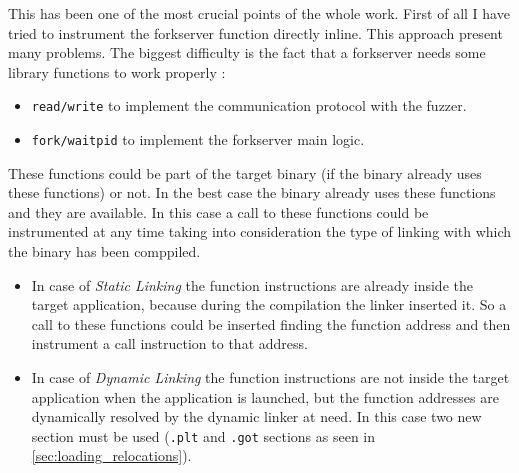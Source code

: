 This has been one of the most crucial points of the whole work.
First of all I have tried to instrument the forkserver function directly inline.
This approach present many problems. The biggest difficulty is the fact that a forkserver needs some library functions 
to work properly :
\begin{itemize}
    \item \texttt{read/write} to implement the communication protocol with the fuzzer.
    \item \texttt{fork/waitpid} to implement the forkserver main logic.
\end{itemize}
These functions could be part of the target binary (if the binary already uses these functions) or not.
In the best case the binary already uses these functions and they are available. 
In this case a call to these functions could be instrumented at any time taking into consideration the type of 
linking with which the binary has been comppiled.
\begin{itemize}
    \item In case of \textit{Static Linking} the function instructions are already inside the target application, 
        because during the compilation the linker inserted it. So a call to these functions could be inserted finding 
        the function address and then instrument a call instruction to that address.
    \item In case of \textit{Dynamic Linking} the function instructions are not inside the target application when 
        the application is launched, but the function addresses are dynamically resolved by the dynamic linker at need. 
        In this case two new section must be used (\texttt{.plt} and \texttt{.got} sections as seen in 
        \cref{sec:loading_relocations}).
\end{itemize}

